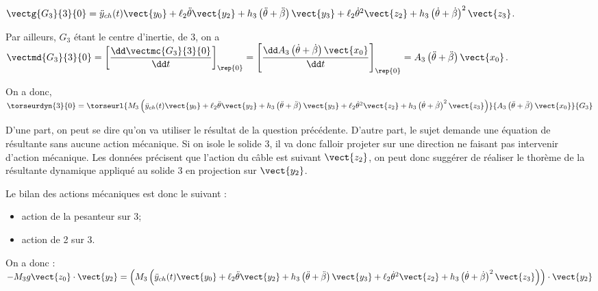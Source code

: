\begin{multicols}{2}
\begin{corrige}
$\vectg{G_3}{3}{0}=   
\ddot{y}_{ch}(t) \vect{y_0}+\ell_2\ddot{\theta} \vect{y_2}+h_3\left(\ddot{\theta}+\ddot{\beta}\right) \vect{y_3}
+   
\ell_2\dot{\theta}^2 \vect{z_2}  +h_3\left(\dot{\theta}+\dot{\beta}\right)^2\vect{z_3} $.

Par ailleurs, $G_3$ étant le centre d'inertie, de 3, on a $\vectmd{G_3}{3}{0}=\left[\dfrac{\dd \vectmc{G_3}{3}{0}}{\dd t}\right]_{\rep{0}}=\left[\dfrac{\dd A_3 \left(\dot{\theta}+\dot{\beta} \right)\vect{x_0}}{\dd t}\right]_{\rep{0}}=A_3 \left(\ddot{\theta}+\ddot{\beta} \right)\vect{x_0}$.

On a donc, $\torseurdyn{3}{0}=\torseurl{M_3\left(\ddot{y}_{ch}(t) \vect{y_0}+\ell_2\ddot{\theta} \vect{y_2}+h_3\left(\ddot{\theta}+\ddot{\beta}\right) \vect{y_3}
+   
\ell_2\dot{\theta}^2 \vect{z_2}  +h_3\left(\dot{\theta}+\dot{\beta}\right)^2\vect{z_3}\right)}{A_3 \left(\ddot{\theta}+\ddot{\beta} \right)\vect{x_0}}{G_3}$
\end{corrige}
\else
\fi

\ifprof
\begin{corrige}

D'une part, on peut se dire qu'on va utiliser le résultat de la question précédente. D'autre part, le sujet demande une équation de résultante sans aucune action mécanique. Si on isole le solide 3, il va donc falloir projeter sur une direction ne faisant pas intervenir d'action mécanique. Les données précisent que l'action du câble est suivant $\vect{z_2}$, on peut donc suggérer de réaliser le thorème de la résultante dynamique appliqué au solide 3 en projection sur $\vect{y_2}$. 

Le bilan des actions mécaniques est donc le suivant : 
\begin{itemize}
\item action de la pesanteur sur 3;
\item action de 2 sur 3.
\end{itemize}

On a donc :
$-M_3 g \vect{z_0}\cdot \vect{y_2} = 
\left( M_3\left(\ddot{y}_{ch}(t) \vect{y_0}+\ell_2\ddot{\theta} \vect{y_2}+h_3\left(\ddot{\theta}+\ddot{\beta}\right) \vect{y_3}
+   
\ell_2\dot{\theta}^2 \vect{z_2}  +h_3\left(\dot{\theta}+\dot{\beta}\right)^2\vect{z_3}\right)\right) \cdot \vect{y_2}$


\end{corrige}
\end{multicols}
